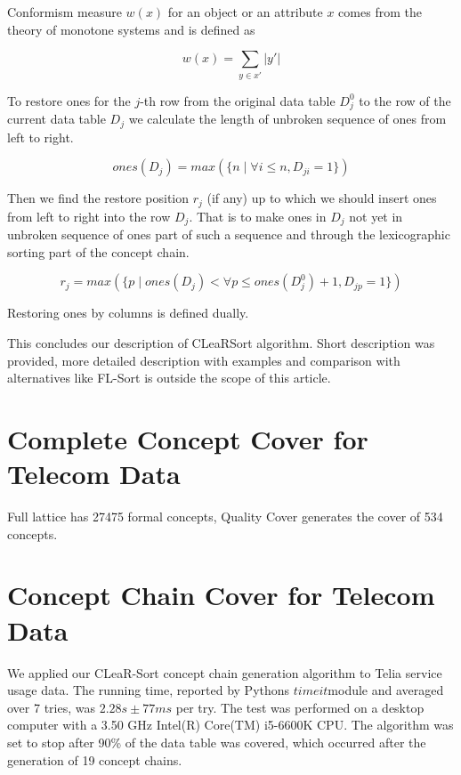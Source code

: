 \documentclass[acmconf,authordraft]{acmart}
\begin{document}
Conformism measure $w(x)$ for an object or an attribute $x$ comes from the theory of monotone systems \cite{vohandu_algorithms_2006} and is defined as

\begin{equation}
w(x) = \sum_{y \in x'}|y'|
\label{ms_weight}
\end{equation}

To restore ones for the $j$-th row from the original data table $D^0_j$ to the row of the current data table $D_j$ we calculate the length of unbroken sequence of ones from left to right.

\begin{equation}
ones(D_j) = max(\{n \mid \forall i \leq n, D_{ji}=1\})
\label{ones}
\end{equation}

Then we find the restore position $r_j$ (if any) up to which we should insert ones from left to right into the row $D_j$. That is to make ones in $D_j$ not yet in unbroken sequence of ones part of such a sequence and through the lexicographic sorting part of the concept chain.

\begin{equation}
r_j = max(\{p \mid   ones(D_j) < \forall p \leq ones(D^0_j)+1, D_{jp}=1\})
\label{restore}
\end{equation}

Restoring ones by columns is defined dually.


This concludes our description of CLeaRSort algorithm. Short description was provided, more detailed description with examples and comparison with alternatives like FL-Sort is outside the scope of this article.

\section{Complete Concept Cover for Telecom Data}
Full lattice has 27475 formal concepts, Quality Cover generates the cover of 534 concepts.

\section{Concept Chain Cover for Telecom Data}

We applied our CLeaR-Sort  concept chain generation algorithm to Telia service usage data. The running time, reported by Pythons $timeit$module and averaged over 7 tries, was $2.28 s \pm 77 ms$ per try. The test was performed on a desktop computer with a 3.50 GHz Intel(R) Core(TM) i5-6600K CPU. The algorithm was set to stop after 90\% of the data table was covered, which occurred after the generation of 19 concept chains. 
\end{document}
